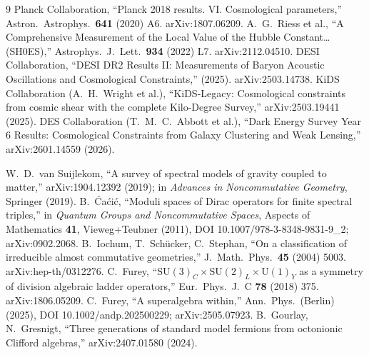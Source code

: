 \documentclass[12pt,a4paper,twoside]{article}
\theoremstyle{plain}
\theoremstyle{definition}
\theoremstyle{remark}
\begin{document}
\begin{thebibliography}{9}
Planck Collaboration, ``Planck 2018 results. VI. Cosmological parameters,'' Astron.\ Astrophys.\ \textbf{641} (2020) A6. arXiv:1807.06209.
A.~G.~Riess et al., ``A Comprehensive Measurement of the Local Value of the Hubble Constant\ldots (SH0ES),'' Astrophys.\ J.\ Lett.\ \textbf{934} (2022) L7. arXiv:2112.04510.
DESI Collaboration, ``DESI DR2 Results II: Measurements of Baryon Acoustic Oscillations and Cosmological Constraints,'' (2025). arXiv:2503.14738.
KiDS Collaboration (A.~H.~Wright et al.), ``KiDS-Legacy: Cosmological constraints from cosmic shear with the complete Kilo-Degree Survey,'' arXiv:2503.19441 (2025).
DES Collaboration (T.~M.~C.~Abbott et al.), ``Dark Energy Survey Year 6 Results: Cosmological Constraints from Galaxy Clustering and Weak Lensing,'' arXiv:2601.14559 (2026).

W.~D.~van Suijlekom, ``A survey of spectral models of gravity coupled to matter,'' arXiv:1904.12392 (2019); in \emph{Advances in Noncommutative Geometry}, Springer (2019).
B.~\'{C}a\'{c}i\'{c}, ``Moduli spaces of Dirac operators for finite spectral triples,'' in \emph{Quantum Groups and Noncommutative Spaces}, Aspects of Mathematics \textbf{41}, Vieweg+Teubner (2011), DOI 10.1007/978-3-8348-9831-9\_2; arXiv:0902.2068.
B.~Iochum, T.~Sch\"{u}cker, C.~Stephan, ``On a classification of irreducible almost commutative geometries,'' J.\ Math.\ Phys.\ \textbf{45} (2004) 5003. arXiv:hep-th/0312276.
C.~Furey, ``$\mathrm{SU}(3)_C\times\mathrm{SU}(2)_L\times\mathrm{U}(1)_Y$ as a symmetry of division algebraic ladder operators,'' Eur.\ Phys.\ J.\ C \textbf{78} (2018) 375. arXiv:1806.05209.
C.~Furey, ``A superalgebra within,'' Ann.\ Phys.\ (Berlin) (2025), DOI 10.1002/andp.202500229; arXiv:2505.07923.
B.~Gourlay, N.~Gresnigt, ``Three generations of standard model fermions from octonionic Clifford algebras,'' arXiv:2407.01580 (2024).
\end{thebibliography}
\end{document}
